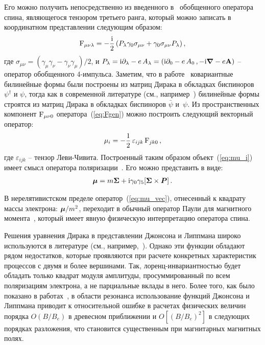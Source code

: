 Его можно получить непосредственно 
из введенного в~\cite{Sokolov:1968} обобщенного оператора спина, 
являющегося тензором третьего ранга, который можно записать в координатном представлении следующим образом:
%
\begin{eqnarray}
	{\rm F}_{\mu \nu \lambda} = - \frac{\mathrm{i}}{2} \left( P_\lambda \gamma_0 \sigma_{\mu \nu} 
	+ \gamma_0 \sigma_{\mu \nu} P_\lambda \right),
	\label{eq:Fgen}
\end{eqnarray}
%
\noindent где $\sigma_{\mu \nu} = (\gamma_\mu \gamma_\nu - \gamma_\nu \gamma_\mu)/2$, и  
$P_\lambda = \mathrm{i} \partial_\lambda -e \, A_\lambda = \left( \mathrm{i} \partial_0 -e \, A_0 \,, 
- \mathrm{i} {\boldsymbol \nabla} -e {\bf A} \right)$ -- оператор обобщенного 4-импульса. 
Заметим, что в работе~\cite{Sokolov:1968} ковариантные билинейные формы были построены из матриц Дирака в обкладках  биспиноров 
$\psi^{\dagger}$ и $\psi$, тогда как в современной литературе (см., например~\cite{Peskin:1995}) билинейные формы строятся из матриц 
Дирака в обкладках биспиноров $\bar\psi$ и~$\psi$. Из пространственных компонент ${\rm F}_{\mu \nu 0}$ 
оператора~(\ref{eq:Fgen}) можно построить следующий векторный оператор:
%
\begin{eqnarray}
	\mu_i = - \frac{1}{2} \, \varepsilon_{ijk} \, {\rm F}_{jk0} \,, 
	\label{eq:mu_i}
\end{eqnarray}
%
где $\varepsilon_{ijk}$ -- тензор Леви-Чивита.  
Построенный таким образом объект~(\ref{eq:mu_i})  имеет смысл 
оператора поляризации~\cite{Sokolov:1968,Melrose:1983}.
Его можно представить в виде:
%
\begin{eqnarray}
	{\boldsymbol\mu} = m {\boldsymbol \Sigma} + \mathrm{i} \gamma_0 \gamma_5 [{\boldsymbol \Sigma} \times 
	{\boldsymbol P}] \, .
	\label{eq:mu_vec}
\end{eqnarray}

В нерелятивистском пределе оператор~(\ref{eq:mu_vec}), 
отнесенный к квадрату массы электрона:  ${\boldsymbol \mu}/m^2$,  
переходит в обычный оператор Паули для магнитного момента~\cite{Landau:1989}, 
который имеет явную физическую интерпретацию оператора спина.

Решения уравнения Дирака в представлении Джонсона и Липпмана широко используются в литературе (см., например,~\cite{Canuto:1975,Harding:1991,Suh:1999,Gonthier:2000,Jones:2010,Melrose:2020}). Однако эти функции обладают рядом недостатков, которые проявляются при расчете конкретных характеристик процессов с двумя и более вершинами. Так, лоренц-инвариантностью будет обладать только квадрат модуля амплитуды, просуммированный по всем поляризациям электрона, а не парциальные вклады в него. Более того, как было показано в работах~\cite{Graziani:1993,Gonthier:2014}, в области резонанса использование функций Джонсона и Липпмана приводит к относительной ошибке в расчетах физических величин порядка $O(B / B_{e})$ в древесном приближении и $O[(B / B_{e})^2]$ в следующих порядках разложения, что становится существенным при магнитарных магнитных полях.

